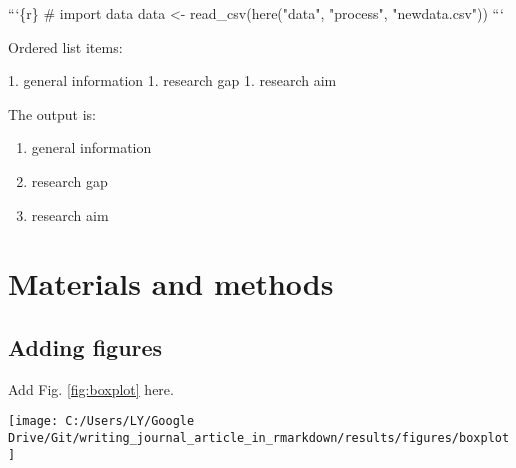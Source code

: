 \documentclass[review]{elsarticle} %
\providecommand{\tightlist}{%
  \setlength{\itemsep}{0pt}\setlength{\parskip}{0pt}}
\newenvironment{Shaded}{\begin{snugshade}}{\end{snugshade}}
\newcommand{\FloatTok}[1]{\textcolor[rgb]{0.00,0.00,0.81}{#1}}
\newcommand{\FunctionTok}[1]{\textcolor[rgb]{0.00,0.00,0.00}{#1}}
\newcommand{\NormalTok}[1]{#1}
\let\origfigure\figure
\let\endorigfigure\endfigure
\renewenvironment{figure}[1][2] {
    \expandafter\origfigure\expandafter[H]
} {
    \endorigfigure
}
\begin{document}
\begin{Shaded}
\begin{Highlighting}[]
\NormalTok{```\{r\}}
\FunctionTok{# import data}
\NormalTok{data <- read_csv(here("data", "process", "newdata.csv"))}
\NormalTok{```}
\end{Highlighting}
\end{Shaded}

Ordered list items:

\begin{Shaded}
\begin{Highlighting}[]
\NormalTok{1. }\FloatTok{general information}
\FloatTok{1. research gap}
\FloatTok{1. research aim}
\end{Highlighting}
\end{Shaded}

The output is:

\begin{enumerate}
\def\labelenumi{\arabic{enumi}.}
\tightlist
\item
  general information
\item
  research gap
\item
  research aim
\end{enumerate}

\section{Materials and methods}\label{method}

\subsection{Adding figures}\label{figure}

Add Fig. \ref{fig:boxplot} here.

\begin{Shaded}
\end{Shaded}

\begin{figure}

{\centering \texttt{[image: C:/Users/LY/Google Drive/Git/writing\_journal\_article\_in\_rmarkdown/results/figures/boxplot]} 

}

\caption{A boxplot}\label{fig:boxplot}
\end{figure}
\end{document}

